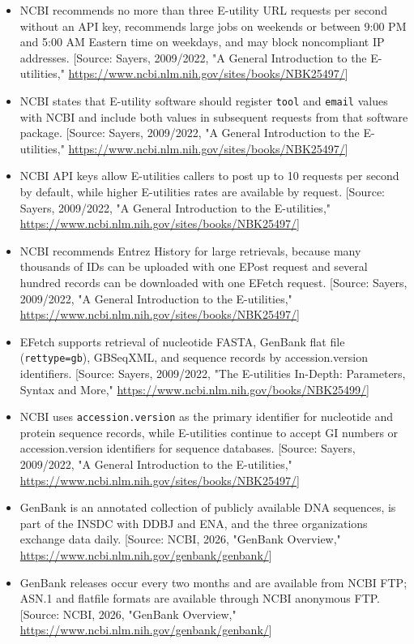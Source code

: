 \documentclass[11pt]{report}
\begin{document}
\begin{itemize}
\item NCBI recommends no more than three E-utility URL requests per second without an API key, recommends large jobs on weekends or between 9:00 PM and 5:00 AM Eastern time on weekdays, and may block noncompliant IP addresses. [Source: Sayers, 2009/2022, "A General Introduction to the E-utilities," \url{https://www.ncbi.nlm.nih.gov/sites/books/NBK25497/}]
\item NCBI states that E-utility software should register \texttt{tool} and \texttt{email} values with NCBI and include both values in subsequent requests from that software package. [Source: Sayers, 2009/2022, "A General Introduction to the E-utilities," \url{https://www.ncbi.nlm.nih.gov/sites/books/NBK25497/}]
\item NCBI API keys allow E-utilities callers to post up to 10 requests per second by default, while higher E-utilities rates are available by request. [Source: Sayers, 2009/2022, "A General Introduction to the E-utilities," \url{https://www.ncbi.nlm.nih.gov/sites/books/NBK25497/}]
\item NCBI recommends Entrez History for large retrievals, because many thousands of IDs can be uploaded with one EPost request and several hundred records can be downloaded with one EFetch request. [Source: Sayers, 2009/2022, "A General Introduction to the E-utilities," \url{https://www.ncbi.nlm.nih.gov/sites/books/NBK25497/}]
\item EFetch supports retrieval of nucleotide FASTA, GenBank flat file (\texttt{rettype=gb}), GBSeqXML, and sequence records by accession.version identifiers. [Source: Sayers, 2009/2022, "The E-utilities In-Depth: Parameters, Syntax and More," \url{https://www.ncbi.nlm.nih.gov/books/NBK25499/}]
\item NCBI uses \texttt{accession.version} as the primary identifier for nucleotide and protein sequence records, while E-utilities continue to accept GI numbers or accession.version identifiers for sequence databases. [Source: Sayers, 2009/2022, "A General Introduction to the E-utilities," \url{https://www.ncbi.nlm.nih.gov/sites/books/NBK25497/}]
\item GenBank is an annotated collection of publicly available DNA sequences, is part of the INSDC with DDBJ and ENA, and the three organizations exchange data daily. [Source: NCBI, 2026, "GenBank Overview," \url{https://www.ncbi.nlm.nih.gov/genbank/genbank/}]
\item GenBank releases occur every two months and are available from NCBI FTP; ASN.1 and flatfile formats are available through NCBI anonymous FTP. [Source: NCBI, 2026, "GenBank Overview," \url{https://www.ncbi.nlm.nih.gov/genbank/genbank/}]

\end{itemize}
\end{document}
